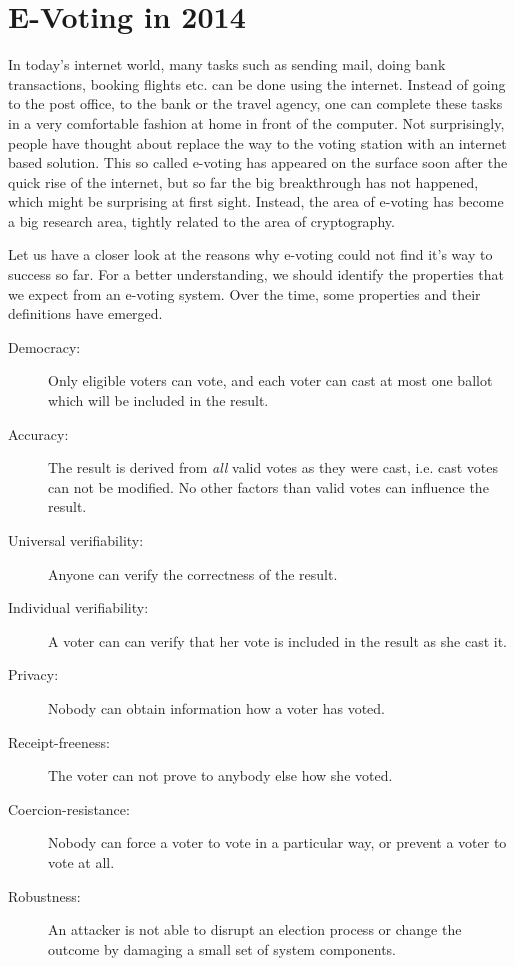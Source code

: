 \documentclass[numbers=noenddot, abstract=on, a4paper, headsepline,
footsepline, oneside, draft=off]{scrreprt}
\begin{document}
\section{E-Voting in 2014}
\label{sec:evoting}
In today's internet world, many tasks such as sending mail, doing bank
transactions, booking flights etc. can be done using the internet. Instead of
going to the post office, to the bank or the travel agency, one can complete
these tasks in a very comfortable fashion at home in front of the computer. Not
surprisingly, people have thought about replace the way to the voting station
with an internet based solution. This so called e-voting has appeared on the
surface soon after the quick rise of the internet, but so far the big
breakthrough has not happened, which might be surprising at first sight.
Instead, the area of e-voting has become a big research area, tightly related to
the area of cryptography.

Let us have a closer look at the reasons why e-voting
could not find it's way to success so far. For a better understanding, we should
identify the properties that we expect from an e-voting system. Over the time,
some properties and their definitions have emerged.

\begin{description}
  \item[Democracy:] Only eligible voters can vote, and each voter can
  cast at most one ballot which will be included in the result.
  \item[Accuracy:] The result is derived from \emph{all} valid
  votes as they were cast, i.e. cast votes can not be modified. No other factors
  than valid votes can influence the result.
  \item[Universal verifiability:] Anyone can verify the correctness of
  the result.
  \item[Individual verifiability:] A voter can can verify that her vote
  is included in the result as she cast it.
  \item[Privacy:] Nobody can obtain information how a voter has
  voted.
  \item[Receipt-freeness:] The voter can not prove to anybody else how
  she voted.
  \item[Coercion-resistance:] Nobody can force a voter to vote in a
  particular way, or prevent a voter to vote at all.
  \item[Robustness:] An attacker is not able to disrupt an election
  process or change the outcome by damaging a small set of system components. 
\end{description}
\end{document}
